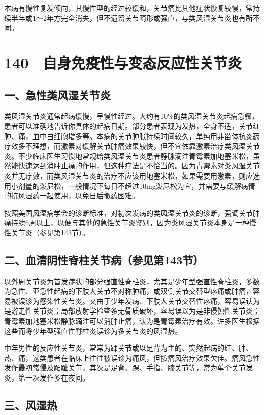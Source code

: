 本病有慢性复发倾向，其慢性型的经过较缓和，关节痛比其他症状恢复较慢，常持续半年或1～2年方完全消失，但不遗留关节畸形或强直，与类风湿关节炎也有所不同。

\protect\hypertarget{text00324.html}{}{}

\section{140　自身免疫性与变态反应性关节炎}

\subsection{一、急性类风湿关节炎}

类风湿关节炎通常起病缓慢，呈慢性经过。大约有10\%的类风湿关节炎起病急骤，患者可以准确地告诉你具体的起病日期。部分患者表现为发热，全身不适，关节红肿、痛，血中白细胞增多等。本病的关节肿胀持续时间较久，单纯用非甾体抗炎药疗效多不理想，而激素对缓解关节肿痛效果较快，但不宜依靠激素治疗类风湿关节炎。不少临床医生习惯地常规给类风湿关节炎患者静脉滴注青霉素加地塞米松，虽然能快速达到消肿止痛的作用，但这种疗法是不恰当的。因为青霉素对类风湿关节炎并无疗效，而类风湿关节炎的治疗不应该用地塞米松，如果需要用激素，则应选用小剂量的泼尼松，一般情况下每日不超过10mg泼尼松为宜，并需要与缓解病情的抗风湿药一起使用，以免日后撤药困难。

按照美国风湿病学会的诊断标准，对初次发病的类风湿关节炎的诊断，强调关节肿痛持续6周以上，以便与其他的急性关节炎鉴别，因为类风湿关节炎本身是一种慢性关节炎（参见第143节）。

\subsection{二、血清阴性脊柱关节病（参见第143节）}

以外周关节炎为首发症状的部分强直性脊柱炎，尤其是少年型强直性脊柱炎，多数为急性、亚急性起病的下肢大关节不对称肿痛，或双侧关节交替型疼痛或肿痛，容易被误诊为感染性关节炎。又由于少年发病、下肢大关节交替性疼痛，容易误认为是游走性关节炎；局部放射学检查多无骨质破坏，容易误以为是非侵蚀性关节炎；青霉素加地塞米松静脉滴注可以消肿止痛，认为是青霉素治疗有效。许多医生根据这些而将少年型强直性脊柱炎误诊为多关节炎的风湿热。

中年男性的反应性关节炎，常常为踝关节或以足背为主的、突然起病的红、肿、热、痛，这类患者在临床上往往被误诊为痛风，但按痛风治疗效果欠佳。痛风急性发作最初常侵及跖趾关节，其次是足背、踝、手指、膝关节等，常为单个关节发炎，第一次发作多在夜间。

\subsection{三、风湿热}

